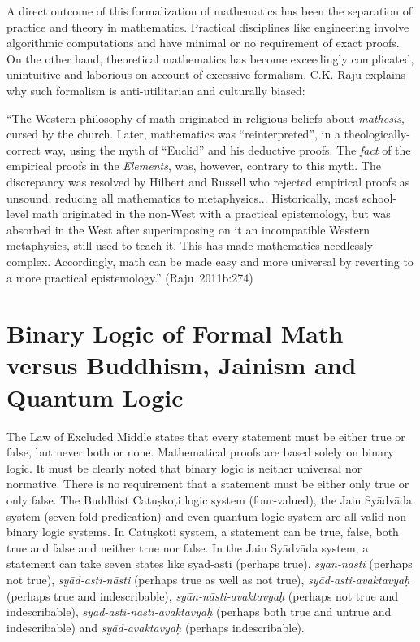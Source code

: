 A direct outcome of this formalization of mathematics has been the separation of practice and theory in mathematics. Practical disciplines like engineering involve algorithmic computations and have minimal or no requirement of exact proofs. On the other hand, theoretical mathematics has become exceedingly complicated, unintuitive and laborious on account of excessive formalism. C.K. Raju explains why such formalism is anti-utilitarian and culturally biased: 
\begin{myquote}
``The Western philosophy of math originated in religious beliefs about {\sl mathesis}, cursed by the church. Later, mathematics was ``reinterpreted'', in a theologically-correct way, using the myth of ``Euclid'' and his deductive proofs. The {\sl fact} of the empirical proofs in the {\sl Elements}, was, however, contrary to this myth. The discrepancy was resolved by Hilbert and Russell who rejected empirical proofs as unsound, reducing all mathematics to metaphysics... Historically, most school-level math originated in the non-West with a practical epistemology, but was absorbed in the West after superimposing on it an incompatible Western metaphysics, still used to teach it. This has made mathematics needlessly complex. Accordingly, math can be made easy and more universal by reverting to a more practical epistemology.''
\hfill \hbox{(Raju 2011b:274)}
\end{myquote}

\section*{Binary Logic of Formal Math versus Buddhism, Jainism and Quantum Logic}

The Law of Excluded Middle states that every statement must be either true or false, but never both or none. Mathematical proofs are based solely on binary logic. It must be clearly noted that binary logic is neither universal nor normative. There is no requirement that a statement must be either only true or only false. The Buddhist Catuṣkoṭi logic system (four-valued), the Jain Syādvāda system (seven-fold predication) and even quantum logic system are all valid non-binary logic systems. In Catuṣkoṭi system, a statement can be true, false, both true and false and neither true nor false. In the Jain Syādvāda system, a statement can take seven states like syād-asti (perhaps true), {\sl syān-nāsti} (perhaps not true), {\sl syād-asti-nāsti} (perhaps true as well as not true), {\sl syād-asti-avaktavyaḥ} (perhaps true and indescribable), {\sl syān-nāsti-avaktavyaḥ} (perhaps not true and indescribable), {\sl syād-asti-nāsti-avaktavyaḥ} (perhaps both true and untrue and indescribable) and {\sl syād-avaktavyaḥ} (perhaps indescribable). 

